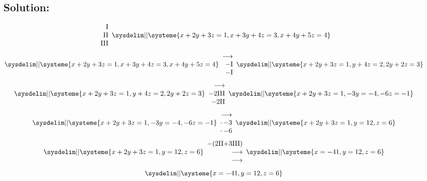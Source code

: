 \documentclass{article}
\begin{document}
\subsection*{Solution:}
\begin{equation*}
    \begin{array}{rr}
        $I$ \\ $II$ \\ $III$
    \end{array}
    \sysdelim||\systeme{
        x + 2y + 3z = 1 ,
        x + 3y + 4z = 3 ,
        x + 4y + 5z = 4
    }
\end{equation*}
\begin{equation*}
    \sysdelim||\systeme{
        x + 2y + 3z = 1 ,
        x + 3y + 4z = 3 ,
        x + 4y + 5z = 4
    }
    \begin{array}{rr}
        \longrightarrow \\
        -$I$ \\
        -$I$ \\
    \end{array}
    \sysdelim||\systeme{
        x + 2y + 3z = 1 ,
        y + 4z = 2 ,
        2y + 2z = 3
    }
\end{equation*}
\begin{equation*}
    \sysdelim||\systeme{
        x + 2y + 3z = 1 ,
        y + 4z = 2 ,
        2y + 2z = 3
    }
    \begin{array}{rr}
        \longrightarrow \\
        -2$III$ \\
        -2$II$ \\
    \end{array}
    \sysdelim||\systeme{
        x + 2y + 3z = 1 ,
        -3y = -4 ,
        -6z = -1
    }
\end{equation*}
\begin{equation*}
    \sysdelim||\systeme{
        x + 2y + 3z = 1 ,
        -3y = -4 ,
        -6z = -1
    }
    \begin{array}{rr}
        \longrightarrow \\
        \cdot \,{-3} \\
        \cdot \,{-6} \\
    \end{array}
    \sysdelim||\systeme{
        x + 2y + 3z = 1 ,
        y = 12 ,
        z = 6
    }
\end{equation*}
\begin{equation*}
    \sysdelim||\systeme{
        x + 2y + 3z = 1 ,
        y = 12 ,
        z = 6
    }
    \begin{array}{rr}
        - (2$II$ + 3$III$)\\
        \longrightarrow \\
        \longrightarrow \\
    \end{array}
    \sysdelim||\systeme{
        x = -41,
        y = 12, 
        z = 6
    }
\end{equation*}
\begin{equation*}
    \sysdelim||\systeme{
        x = -41,
        y = 12, 
        z = 6
    }
\end{equation*}
\end{document}
